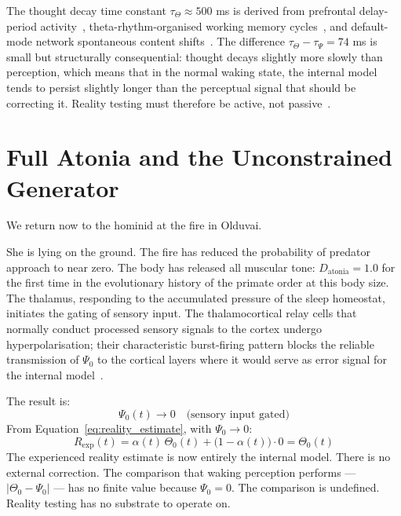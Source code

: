 The thought decay time constant $\tau_\Theta \approx 500$ ms is derived from prefrontal delay-period activity~\cite{fuster1971}, theta-rhythm-organised working memory cycles~\cite{lisman1995}, and default-mode network spontaneous content shifts~\cite{smallwood2015}. The difference $\tau_\Theta - \tau_\Psi = 74$ ms is small but structurally consequential: thought decays slightly more slowly than perception, which means that in the normal waking state, the internal model tends to persist slightly longer than the perceptual signal that should be correcting it. Reality testing must therefore be active, not passive~\cite{author_dream}.

\bigskip

\section{Full Atonia and the Unconstrained Generator}

We return now to the hominid at the fire in Olduvai.

She is lying on the ground. The fire has reduced the probability of predator approach to near zero. The body has released all muscular tone: $D_{\mathrm{atonia}} = 1.0$ for the first time in the evolutionary history of the primate order at this body size. The thalamus, responding to the accumulated pressure of the sleep homeostat, initiates the gating of sensory input. The thalamocortical relay cells that normally conduct processed sensory signals to the cortex undergo hyperpolarisation; their characteristic burst-firing pattern blocks the reliable transmission of $\Psi_0$ to the cortical layers where it would serve as error signal for the internal model~\cite{steriade2001, chase1990}.

The result is:
%
\begin{equation}
\Psi_0(t) \to 0 \quad \text{(sensory input gated)}
\end{equation}
%
From Equation~\eqref{eq:reality_estimate}, with $\Psi_0 \to 0$:
%
\begin{equation}
R_{\mathrm{exp}}(t) = \alpha(t)\,\Theta_0(t) + \bigl(1-\alpha(t)\bigr) \cdot 0 = \Theta_0(t)
\end{equation}
%
The experienced reality estimate is now entirely the internal model. There is no external correction. The comparison that waking perception performs --- $|\Theta_0 - \Psi_0|$ --- has no finite value because $\Psi_0 = 0$. The comparison is undefined. Reality testing has no substrate to operate on.

